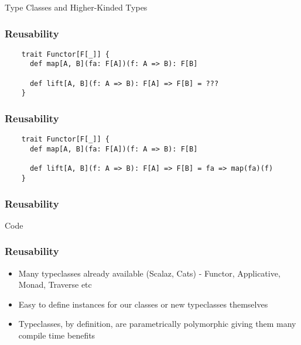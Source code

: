 \begin{section}{Type Classes and Higher-Kinded Types}
\begin{frame}[fragile]
  \frametitle{Reusability}
  \begin{verbatim}
    trait Functor[F[_]] {
      def map[A, B](fa: F[A])(f: A => B): F[B]

      def lift[A, B](f: A => B): F[A] => F[B] = ???
    }
  \end{verbatim}
\end{frame}

\begin{frame}[fragile]
  \frametitle{Reusability}
  \begin{verbatim}
    trait Functor[F[_]] {
      def map[A, B](fa: F[A])(f: A => B): F[B]

      def lift[A, B](f: A => B): F[A] => F[B] = fa => map(fa)(f)
    }
  \end{verbatim}
\end{frame}

\begin{frame}[fragile]
  \frametitle{Reusability}
  \centerline{
    \huge{Code}
  }
\end{frame}
\end{section}

\begin{frame}[fragile]
  \frametitle{Reusability}
  \begin{itemize}
  \item Many typeclasses already available (Scalaz, Cats) - Functor, Applicative, Monad, Traverse etc
  \item Easy to define instances for our classes or new typeclasses themselves
  \item Typeclasses, by definition, are parametrically polymorphic giving them many compile time benefits
  \end{itemize}
\end{frame}
